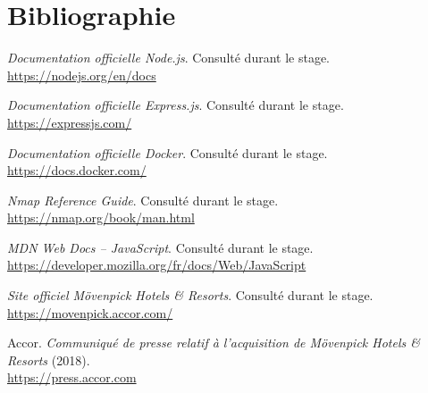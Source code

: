 \chapter*{Bibliographie}

\begin{enumerate}[label={[\arabic*]}, leftmargin=1.4cm]
    \item \emph{Documentation officielle Node.js}. Consulté durant le stage.\\
    \url{https://nodejs.org/en/docs}

    \item \emph{Documentation officielle Express.js}. Consulté durant le stage.\\
    \url{https://expressjs.com/}

    \item \emph{Documentation officielle Docker}. Consulté durant le stage.\\
    \url{https://docs.docker.com/}

    \item \emph{Nmap Reference Guide}. Consulté durant le stage.\\
    \url{https://nmap.org/book/man.html}

    \item \emph{MDN Web Docs -- JavaScript}. Consulté durant le stage.\\
    \url{https://developer.mozilla.org/fr/docs/Web/JavaScript}

    \item \emph{Site officiel Mövenpick Hotels \& Resorts}. Consulté durant le stage.\\
    \url{https://movenpick.accor.com/}

    \item Accor. \emph{Communiqué de presse relatif à l'acquisition de Mövenpick
    Hotels \& Resorts} (2018).\\
    \url{https://press.accor.com}
\end{enumerate}
